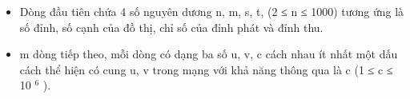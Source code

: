\begin{itemize}
	\item     Dòng đầu tiên chứa 4 số nguyên dương n, m, s, t, (2 ≤ n ≤ 1000) tương ứng là số đỉnh, số cạnh của đồ thị, chỉ số của đỉnh phát và đỉnh thu.   
	\item     m dòng tiếp theo, mỗi dòng có dạng ba số u, v, c cách nhau ít nhất một dấu cách thể hiện có cung u, v trong mạng với khả năng thông qua là c (1 ≤ c ≤ 10    $^     6    $    ).   
\end{itemize}